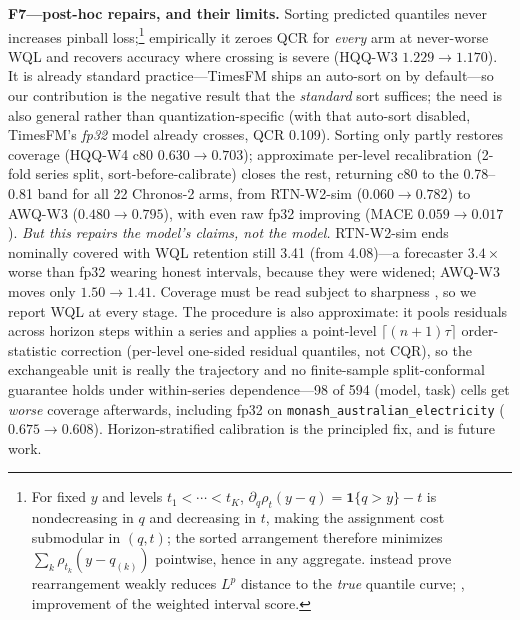 \documentclass{article}
\begin{document}
\vspace{1pt}\noindent\textbf{F7---post-hoc repairs, and their limits.} Sorting predicted
quantiles never increases pinball loss;\footnote{For fixed $y$ and levels
$t_1{<}\cdots{<}t_K$, $\partial_q\rho_t(y-q)=\mathbf{1}\{q{>}y\}-t$ is nondecreasing in
$q$ and decreasing in $t$, making the assignment cost submodular in $(q,t)$; the sorted
arrangement therefore minimizes $\sum_k\rho_{t_k}(y-q_{(k)})$ pointwise, hence in any
aggregate. \citet{rearrangement} instead prove rearrangement weakly reduces $L^p$
distance to the \emph{true} quantile curve; \citet{fakoor}, improvement of the weighted
interval score.} empirically it zeroes QCR for \emph{every} arm at never-worse WQL and
recovers accuracy where crossing is severe (HQQ-W3 $1.229\to1.170$). It is already
standard practice---TimesFM ships an auto-sort on by default---so our contribution is the
negative result that the \emph{standard} sort suffices; the need is also general rather
than quantization-specific (with that auto-sort disabled, TimesFM's \emph{fp32} model
already crosses, QCR 0.109). Sorting only partly restores coverage (HQQ-W4 c80
$0.630\to0.703$); approximate per-level recalibration (2-fold series split,
sort-before-calibrate) closes the rest, returning c80 to the 0.78--0.81 band for all 22
Chronos-2 arms, from RTN-W2-sim ($0.060\to0.782$) to AWQ-W3 ($0.480\to0.795$), with even
raw fp32 improving (MACE $0.059\to0.017$). \emph{But this repairs the model's claims, not
the model.} RTN-W2-sim ends nominally covered with WQL retention still 3.41 (from
4.08)---a forecaster $3.4\times$ worse than fp32 wearing honest intervals, because they
were widened; AWQ-W3 moves only $1.50\to1.41$. Coverage must be read subject to sharpness
\citep{sharpness}, so we report WQL at every stage. The procedure is also approximate: it
pools residuals across horizon steps within a series and applies a point-level
$\lceil(n{+}1)\tau\rceil$ order-statistic correction (per-level one-sided residual
quantiles, not CQR), so the exchangeable unit is really the trajectory and no
finite-sample split-conformal guarantee holds under within-series dependence---98 of 594
(model, task) cells get \emph{worse} coverage afterwards, including fp32 on
\texttt{monash\_australian\_electricity} ($0.675\to0.608$). Horizon-stratified
calibration \citep{cts} is the principled fix, and is future work.
\end{document}
